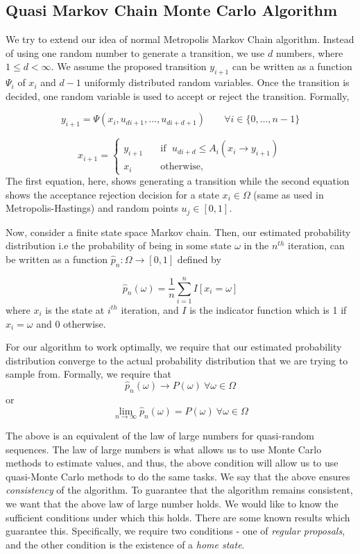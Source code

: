 \documentclass[12pt,letterpaper, twoside]{article}
\theoremstyle{definition}
\begin{document}
\subsection{Quasi Markov Chain Monte Carlo Algorithm}
We try to extend our idea of normal Metropolis Markov Chain algorithm. Instead of using one random number to generate a transition, we use $d$ numbers, where $1\leq d< \infty$. We assume the proposed transition $y_{i+1}$ can be written as a function $\Psi_{i}$ of $x_i$ and $d-1$ uniformly distributed random variables. Once the transition is decided, one random variable is used to accept or reject the transition. Formally,

\begin{equation*}
    y_{i+1} = \Psi(x_i, u_{di+1}, \dots, u_{di+d+1}) \; \; \; \;\;\;\; \forall i \in \{0,\dots, n-1\}
\end{equation*}

\begin{equation*}
    x_{i+1} =
     \begin{cases}
        y_{i+1}       & \quad \text{if } \; u_{di+d} \leq A_i(x_i \to y_{i+1})\\
        x_i  & \quad \text{otherwise,} 
    \end{cases}
\end{equation*}
The first equation, here, shows generating a transition while the second equation shows the acceptance rejection decision for a state $x_i \in \Omega$ (same as used in Metropolis-Hastings) and random points $u_j \in [0,1]$. 

Now, consider a finite state space Markov chain. Then, our estimated probability distribution i.e the probability of being in some state $\omega$ in the $n^{th}$ iteration, can be written as a function $\hat{p}_n : \Omega \to [0,1]$ defined by 

$$
\hat{p}_n(\omega) = \frac{1}{n}\sum_{i=1}^{n} I[x_i = \omega]
$$ where $x_i$ is the state at $i^{th}$ iteration, and $I$ is the indicator function which is 1 if $x_i=\omega$ and 0 otherwise.

For our algorithm to work optimally, we require that our estimated probability distribution converge to the actual probability distribution that we are trying to sample from. Formally, we require that
$$
\hat{p}_n(\omega) \to P(\omega) \ \forall \omega \in \Omega 
$$ or 
$$
\lim_{n \to \infty} \hat{p}_n(\omega) = P(\omega) \ \forall \omega \in \Omega 
$$ 

The above is an equivalent of the law of large numbers for quasi-random sequences. The law of large numbers is what allows us to use Monte Carlo methods to estimate values, and thus, the above condition will allow us to use quasi-Monte Carlo methods to do the same tasks. We say that the above ensures \emph{consistency} of the algorithm. 
To guarantee that the algorithm remains consistent, we want that the above law of large number holds. We would like to know the sufficient conditions under which this holds. There are some known results which guarantee this. Specifically, we require two conditions - one of \emph{regular proposals}, and the other condition is the existence of a \emph{home state}.
\end{document}
